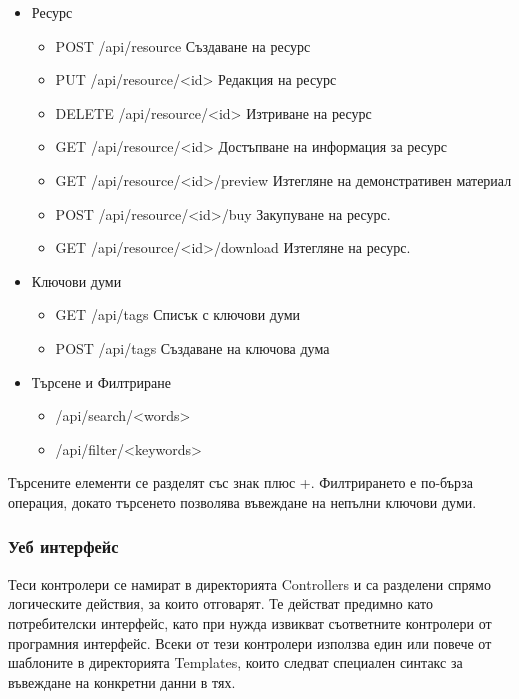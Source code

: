 \begin{itemize}
    \item{Ресурс}
    \begin{itemize}
        \item POST /api/resource
            Създаване на ресурс
        \item PUT /api/resource/<id>
            Редакция на ресурс
        \item DELETE /api/resource/<id>
            Изтриване на ресурс
        \item GET /api/resource/<id>
            Достъпване на информация за ресурс
        \item GET /api/resource/<id>/preview
            Изтегляне на демонстративен материал
        \item POST /api/resource/<id>/buy
            Закупуване на ресурс.
        \item GET /api/resource/<id>/download
            Изтегляне на ресурс.
    \end{itemize}

    \item{Ключови думи}
    \begin{itemize}
        \item GET /api/tags
            Списък с ключови думи
        \item POST /api/tags
            Създаване на ключова дума
    \end{itemize}

    \item{Търсене и Филтриране}
    \begin{itemize}
        \item /api/search/<words>
        \item /api/filter/<keywords>
    \end{itemize}
\end{itemize}

Търсените елементи се разделят със знак плюс +.
Филтрирането е по-бърза операция, докато търсенето
позволява въвеждане на непълни ключови думи.

\subsubsection{Уеб интерфейс}
Теси контролери се намират в директорията Controllers
и са разделени спрямо логическите действия, за които
отговарят. Те действат предимно като потребителски
интерфейс, като при нужда извикват съответните контролери
от програмния интерфейс.
Всеки от тези контролери използва един или повече от
шаблоните в директорията Templates, които следват
специален синтакс за въвеждане на конкретни данни в тях.

